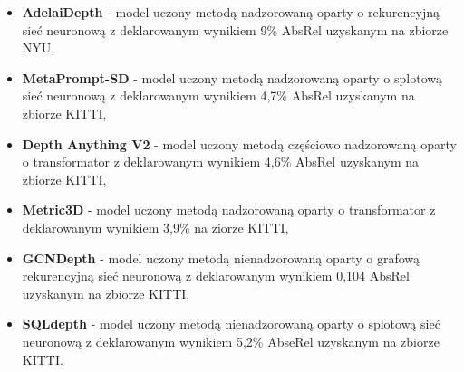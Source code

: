 \begin{itemize} 
    \item \textbf{AdelaiDepth} - model uczony metodą nadzorowaną oparty o rekurencyjną sieć neuronową z deklarowanym wynikiem 9\% AbsRel uzyskanym na zbiorze NYU,
    \item \textbf{MetaPrompt-SD} - model uczony metodą nadzorowaną oparty o splotową sieć neuronową z deklarowanym wynikiem 4,7\% AbsRel uzyskanym na zbiorze KITTI, 
    \item \textbf{Depth Anything V2} - model uczony metodą częściowo nadzorowaną oparty o transformator z deklarowanym wynikiem 4,6\% AbsRel uzyskanym na zbiorze KITTI, 
    \item \textbf{Metric3D} - model uczony metodą nadzorowaną oparty o transformator z deklarowanym wynikiem 3,9\% na ziorze KITTI, 
    \item \textbf{GCNDepth} - model uczony metodą nienadzorowaną oparty o grafową rekurencyjną sieć neuronową z deklarowanym wynikiem 0,104 AbsRel uzyskanym na zbiorze KITTI,
    \item \textbf{SQLdepth} - model uczony metodą nienadzorowaną oparty o splotową sieć neuronową z deklarowanym wynikiem 5,2\% AbseRel uzyskanym na zbiorze KITTI.
\end{itemize}